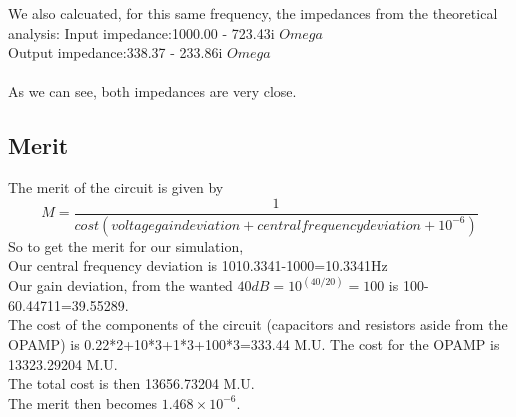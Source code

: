 We also calcuated, for this same frequency, the impedances from the theoretical analysis:
Input impedance:1000.00 -  723.43i $Omega$\\
Output impedance:338.37 - 233.86i $Omega$\\
\\
As we can see, both impedances are very close.\\

\subsection{Merit}
The merit of the circuit is given by
\begin{equation}
  M=\frac{1}{cost(voltage gain deviation+ central frequency deviation+10^{-6})}
\end{equation}
So to get the merit for our simulation,\\
Our central frequency deviation is 1010.3341-1000=10.3341Hz\\
Our gain deviation, from the wanted $40dB=10^{(40/20)}=100$ is 100-60.44711=39.55289.\\
The cost of the components of the circuit (capacitors and resistors aside from the OPAMP) is 0.22*2+10*3+1*3+100*3=333.44 M.U. The cost for the OPAMP is 13323.29204 M.U.\\
The total cost is then 13656.73204 M.U.\\
The merit then becomes $1.468\times 10^{-6}$.
